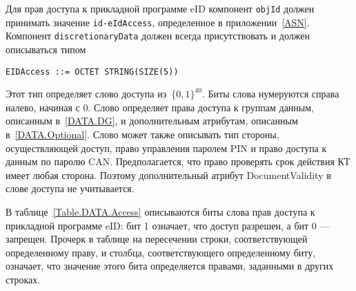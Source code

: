 Для прав доступа к прикладной программе eID компонент \verb|objId| должен принимать 
значение \verb|id-eIdAccess|, определенное в приложении~\ref{ASN}. 
Компонент \verb|discretionaryData| должен всегда присутствовать и 
должен описываться типом  

\begin{verbatim}
EIDAccess ::= OCTET STRING(SIZE(5))
\end{verbatim}

Этот тип определяет слово доступа из~$\{0,1\}^{40}$. 
Биты слова нумеруются справа налево, начиная с 0. 
Слово определяет права доступа к группам данным, описанным в~\ref{DATA.DG}, 
и дополнительным атрибутам, описанным в~\ref{DATA.Optional}. 
Слово может также описывать тип стороны, осуществляющей доступ, право 
управления паролем PIN и право доступа к данным по паролю CAN. 
Предполагается, что право проверять срок действия КТ имеет любая сторона. 
Поэтому дополнительный атрибут DocumentValidity в слове доступа не 
учитывается. 

В таблице~\ref{Table.DATA.Access} описываются биты слова прав 
доступа к прикладной программе eID: бит 1 означает,
что доступ разрешен, а бит 0 --- запрещен.
Прочерк в таблице 
на пересечении строки, соответствующей определенному праву, и столбца, 
соответствующего определенному биту, означает, что значение этого бита 
определяется правами, заданными в других строках.  

